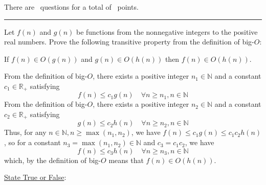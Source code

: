 \documentclass[answers]{exam}
\newenvironment{answer}{%
     \renewcommand{\solutiontitle}{\noindent\textbf{Answer:}\enspace}
     \begin{solution}
     }{%
     \end{solution}
     \renewcommand{\solutiontitle}{\noindent\textbf{Solution:}\enspace}
 }
\begin{document}
\vspace{0.1in}
There are \numquestions\, questions for a total of \numpoints\, points.
\vspace{0.1in}
\hrule
 \vspace{0.2in}
\begin{questions}
 
\question[10] Let $f(n)$ and $g(n)$ be functions from the nonnegative integers to the positive real numbers. Prove the following transitive property from the definition of big-$O$: \\
\begin{center}
If $f (n) \in O(g (n))$ and $g (n) \in O(h(n))$ then
$f (n) \in O(h(n)).$
\end{center}

\begin{solution}

    From the definition of big-$O$, there exists a positive integer $n_1 \in \mathbb{N}$ and a constant $c_1 \in \mathbb{R}_+$ satisfying $$f(n) \le c_1 g(n) \quad \forall n \ge n_1, n \in \mathbb{N}$$
    From the definition of big-$O$, there exists a positive integer $n_2 \in \mathbb{N}$ and a constant $c_2 \in \mathbb{R}_+$ satisfying $$g(n) \le c_2 h(n) \quad \forall n \ge n_2, n \in \mathbb{N}$$
    Thus, for any $n \in \mathbb{N}, n \ge \max(n_1, n_2)$, we have $f(n) \le c_1 g(n) \le c_1 c_2 h(n)$, so for a constant $n_3 = \max(n_1, n_2) \in \mathbb{N}$ and $c_3 = c_1 c_2$, we have $$f(n) \le c_3 h(n) \quad \forall n \ge n_3, n \in \mathbb{N}$$ which, by the definition of big-$O$ means that $f(n) \in O(h(n))$.

\end{solution}

\question \underline{State True or False}:
\end{questions}
\end{document}

